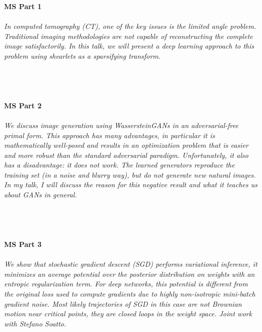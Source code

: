 \begin{multicols}{2}
    \\
    \\\\
    \noindent\textbf{MS Part 1}\\
\\  
    \textit{In computed tomography (CT), one of the key issues is the limited angle problem. Traditional imaging methodologies are not capable of reconstructing the complete image satisfactorily. In this talk, we will present a deep learning approach to this problem using shearlets as a sparsifying transform.}\\
\\ 
    \\
    \\\\
    \noindent\textbf{MS Part 2}\\
\\  
    \textit{We discuss image generation using WassersteinGANs in an adversarial-free primal form. This approach has many advantages, in particular it is mathematically well-posed and results in an optimization problem that is easier and more robust than the standard adversarial paradigm. Unfortunately, it also has a disadvantage: it does not work. The learned generators reproduce the training set (in a noise and blurry way), but do not generate new natural images. In my talk, I will discuss the reason for this negative result and what it teaches us about GANs in general.}\\
\\ 
    \\
    \\\\
    \noindent\textbf{MS Part 3}\\
\\  
    \textit{We show that stochastic gradient descent (SGD) performs variational inference, it minimizes an average potential over the posterior distribution on weights with an entropic regularization term. For deep networks, this potential is different from the original loss used to compute gradients due to highly non-isotropic mini-batch gradient noise. Most likely trajectories of SGD in this case are not Brownian motion near critical points, they are closed loops in the weight space. Joint work with Stefano Soatto.}\\
\\ 
    \\

\end{multicols}
